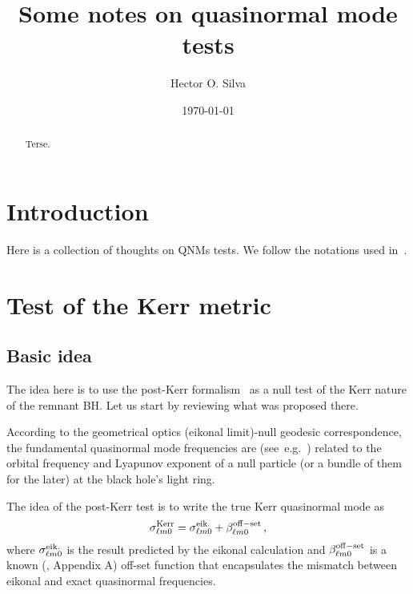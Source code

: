 \documentclass[aps,prd,10pt,preprint,
               notitlepage,onecolumn,superscriptaddress,
               eqsecnum,
               nofootinbib,tightenlines,floatfix]{revtex4-2}
\begin{document}
\title{Some notes on quasinormal mode tests}

\begin{abstract}
Terse.
\end{abstract}

\author{Hector O. Silva}

\date{{\today}}

\maketitle

\tableofcontents

\section{Introduction}

Here is a collection of thoughts on QNMs tests.
%
We follow the notations used in~\cite{Ghosh:2021mrv}.

\section{Test of the Kerr metric}

\subsection{Basic idea}

The idea here is to use the post-Kerr formalism~\cite{Glampedakis:2017dvb} as a null test of
the Kerr nature of the remnant BH.
%
Let us start by reviewing what was proposed there.

According to the geometrical optics (eikonal limit)-null geodesic
correspondence, the fundamental quasinormal mode frequencies are
(see~e.g.~\cite{Ferrari:1984zz,Cardoso:2008bp}) related to the orbital frequency and Lyapunov
exponent of a null particle (or a bundle of them for the later) at the black
hole's light ring.

The idea of the post-Kerr test is to write the true Kerr quasinormal mode as
%
\begin{equation}
    \sigma_{\ell m 0}^{\rm Kerr} = \sigma_{\ell m 0}^{\rm eik.} + \beta_{\ell m 0}^{\rm off-set}\,,
    \label{eq:qnm_kerr_exact}
\end{equation}
%
where $\sigma_{\ell m 0}^{\rm eik.}$ is the result predicted by the eikonal
calculation and $\beta_{\ell m 0}^{\rm off-set}$ is a known
(\cite{Glampedakis:2017dvb}, Appendix A) off-set function that encapsulates the
mismatch between eikonal and exact quasinormal frequencies.
\end{document}
